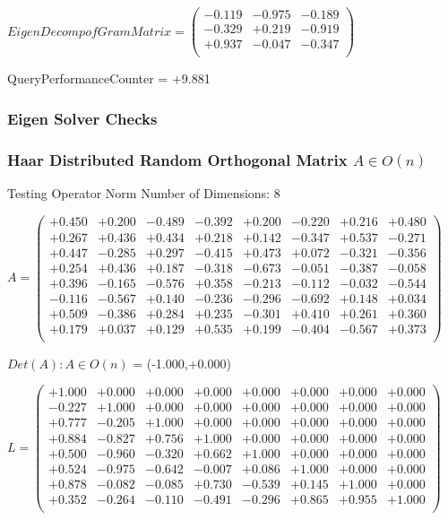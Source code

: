 \documentclass[9pt]{article}
\theoremstyle{plain}
\theoremstyle{definition}
\theoremstyle{remark}
\numberwithin{equation}{section}
\begin{document}
$EigenDecomp of Gram Matrix = \left(
\begin{array}{
ccc}
-0.119 & -0.975 & -0.189 \\
-0.329 & +0.219 & -0.919 \\
+0.937 & -0.047 & -0.347 \\
\end{array}
\right)$ \newline 

QueryPerformanceCounter  =  +9.881
\subsubsection{Eigen Solver Checks}
\subsubsection{Haar Distributed Random Orthogonal Matrix $A \in O(n)$}
 Testing Operator Norm
Number of Dimensions: 8

$A = \left(
\begin{array}{
cccccccc}
+0.450 & +0.200 & -0.489 & -0.392 & +0.200 & -0.220 & +0.216 & +0.480 \\
+0.267 & +0.436 & +0.434 & +0.218 & +0.142 & -0.347 & +0.537 & -0.271 \\
+0.447 & -0.285 & +0.297 & -0.415 & +0.473 & +0.072 & -0.321 & -0.356 \\
+0.254 & +0.436 & +0.187 & -0.318 & -0.673 & -0.051 & -0.387 & -0.058 \\
+0.396 & -0.165 & -0.576 & +0.358 & -0.213 & -0.112 & -0.032 & -0.544 \\
-0.116 & -0.567 & +0.140 & -0.236 & -0.296 & -0.692 & +0.148 & +0.034 \\
+0.509 & -0.386 & +0.284 & +0.235 & -0.301 & +0.410 & +0.261 & +0.360 \\
+0.179 & +0.037 & +0.129 & +0.535 & +0.199 & -0.404 & -0.567 & +0.373 \\
\end{array}
\right)$ \newline 

$Det(A) :   A \in O(n)$ = (-1.000,+0.000)

$L = \left(
\begin{array}{
cccccccc}
+1.000 & +0.000 & +0.000 & +0.000 & +0.000 & +0.000 & +0.000 & +0.000 \\
-0.227 & +1.000 & +0.000 & +0.000 & +0.000 & +0.000 & +0.000 & +0.000 \\
+0.777 & -0.205 & +1.000 & +0.000 & +0.000 & +0.000 & +0.000 & +0.000 \\
+0.884 & -0.827 & +0.756 & +1.000 & +0.000 & +0.000 & +0.000 & +0.000 \\
+0.500 & -0.960 & -0.320 & +0.662 & +1.000 & +0.000 & +0.000 & +0.000 \\
+0.524 & -0.975 & -0.642 & -0.007 & +0.086 & +1.000 & +0.000 & +0.000 \\
+0.878 & -0.082 & -0.085 & +0.730 & -0.539 & +0.145 & +1.000 & +0.000 \\
+0.352 & -0.264 & -0.110 & -0.491 & -0.296 & +0.865 & +0.955 & +1.000 \\
\end{array}
\right)$ \newline 
\end{document}
